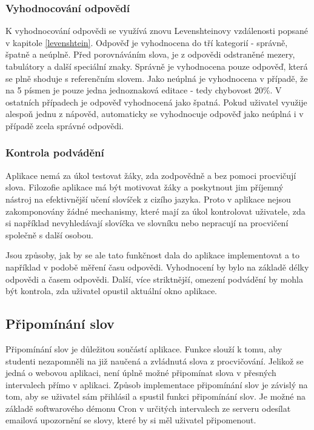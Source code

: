 \documentclass[a4paper,11pt,titlepage,fleqn]{article}
\begin{document}
        \subsubsection{Vyhodnocování odpovědí}
            K vyhodnocování odpovědi se využívá znovu Levenshteinovy vzdálenosti popsané v kapitole \ref{levenshtein}. Odpověď je vyhodnocena do tří kategorií - správně, špatně a neúplně. Před porovnáváním slova, je z odpovědi odstraněné mezery, tabulátory a další speciální znaky. Správně je vyhodnocena pouze odpověď, která se plně shoduje s referenčním slovem. Jako neúplná je vyhodnocena v případě, že na 5 písmen je pouze jedna jednoznaková editace - tedy chybovost 20\%. V ostatních případech je odpověď vyhodnocená jako špatná. Pokud uživatel využije alespoň jednu z nápověd, automaticky se vyhodnocuje odpověď jako neúplná i v případě zcela správné odpovědi. 

        \subsubsection{Kontrola podvádění}
            Aplikace nemá za úkol testovat žáky, zda zodpovědně a bez pomoci procvičují slova. Filozofie aplikace má být motivovat žáky a poskytnout jim příjemný nástroj na efektivnější učení slovíček z cizího jazyka. Proto v aplikace nejsou zakomponovány žádné mechanismy, které mají za úkol kontrolovat uživatele, zda si například nevyhledávají slovíčka ve slovníku nebo nepracují na procvičení společně s další osobou. 

            Jsou způsoby, jak by se ale tato funkčnost dala do aplikace implementovat a to například v podobě měření času odpovědi. Vyhodnocení by bylo na základě délky odpovědi a časem odpovědi. Další, více striktnější, omezení podvádění by mohla být kontrola, zda uživatel opustil aktuální okno aplikace.

    \subsection{Připomínání slov}
        Připomínání slov je důležitou součástí aplikace. Funkce slouží k tomu, aby studenti nezapomněli na již naučená a zvládnutá slova z procvičování. Jelikož se jedná o webovou aplikaci, není úplně možné připomínat slova v přesných intervalech přímo v aplikaci. Způsob implementace připomínání slov je závislý na tom, aby se uživatel sám přihlásil a spustil funkci připomínání slov. Je možné na základě softwarového démonu Cron v určitých intervalech ze serveru odesílat emailová upozornění se slovy, které by si měl uživatel připomenout.
\end{document}
